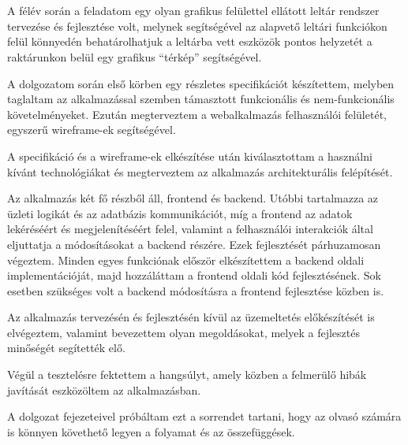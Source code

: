 \chapter{\bevezetes}

A félév során a feladatom egy olyan grafikus felülettel ellátott leltár rendszer tervezése és fejlesztése volt, melynek segítségével az alapvető leltári funkciókon felül könnyedén behatárolhatjuk a leltárba vett eszközök pontos helyzetét a raktárunkon belül egy grafikus “térkép” segítségével.

A dolgozatom során első körben egy részletes specifikációt készítettem, melyben taglaltam az alkalmazással szemben támasztott funkcionális és nem-funkcionális követelményeket.
Ezután megterveztem a webalkalmazás felhasználói felületét, egyszerű wireframe-ek segítségével.

A specifikáció és a wireframe-ek elkészítése után kiválasztottam a használni kívánt technológiákat és megterveztem az alkalmazás architekturális felépítését.

Az alkalmazás két fő részből áll, frontend és backend. Utóbbi tartalmazza az üzleti logikát és az adatbázis kommunikációt, míg a frontend az adatok lekéréséért és megjelenítéséért felel, valamint a felhasználói interakciók által eljuttatja a módosításokat a backend részére.
Ezek fejlesztését párhuzamosan végeztem. Minden egyes funkciónak először elkészítettem a backend oldali implementációját, majd hozzáláttam a frontend oldali kód fejlesztésének. Sok esetben szükséges volt a backend módosításra a frontend fejlesztése közben is.

Az alkalmazás tervezésén és fejlesztésén kívül az üzemeltetés előkészítését is elvégeztem, valamint bevezettem olyan megoldásokat, melyek a fejlesztés minőségét segítették elő.

Végül a tesztelésre fektettem a hangsúlyt, amely közben a felmerülő hibák javítását eszközöltem az alkalmazásban.

A dolgozat fejezeteivel próbáltam ezt a sorrendet tartani, hogy az olvasó számára is könnyen követhető legyen a folyamat és az összefüggések.